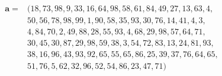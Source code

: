 \begin{align*}
\boldsymbol a={}&(18, 73, 98, 9, 33, 16, 64, 98, 58, 61, 84, 49, 27, 13, 63, 4, \\
 &50, 56, 78, 98, 99, 1, 90, 58, 35, 93, 30, 76, 14, 41, 4, 3, \\
 &4, 84, 70, 2, 49, 88, 28, 55, 93, 4, 68, 29, 98, 57, 64, 71, \\
 &30, 45, 30, 87, 29, 98, 59, 38, 3, 54, 72, 83, 13, 24, 81, 93, \\
 &38, 16, 96, 43, 93, 92, 65, 55, 65, 86, 25, 39, 37, 76, 64, 65, \\
 &51, 76, 5, 62, 32, 96, 52, 54, 86, 23, 47, 71)
\end{align*}
